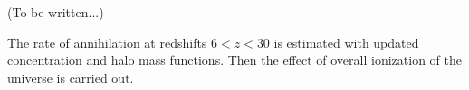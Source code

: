 (To be written...)

The rate of annihilation at redshifts $6<z<30$ is estimated with updated concentration and halo mass functions. Then the effect of overall ionization of the universe is carried out.
